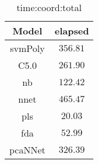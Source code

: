 \begin{table}[!ht]
	\centering
	\begin{tabular}{|c|c|}
		\hline
		Model & elapsed \\ \hline
		svmPoly & $356.81$ \\ \hline
		C5.0 & $261.90$ \\ \hline
		nb & $122.42$ \\ \hline
		nnet & $465.47$ \\ \hline
		pls & $20.03$ \\ \hline
		fda & $52.99$ \\ \hline
		pcaNNet & $326.39$ \\ \hline
	\end{tabular}
	\caption{time:coord:total}
	\label{tab:time:coord:total}
\end{table}
